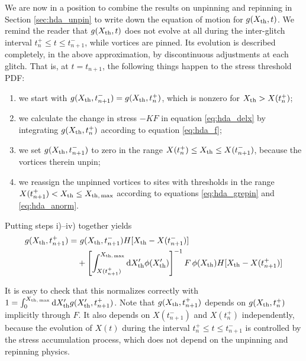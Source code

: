 We are now in a position to combine the results on unpinning and repinning in Section \ref{sec:hda_unpin} to write down the equation of motion for $g(X_{\rm th},t)$. We remind the reader that $g(X_{\rm th},t)$ does not evolve at all during the inter-glitch interval $t_n^+ \leq t \leq t_{n+1}^-$, while vortices are pinned. Its evolution is described completely, in the above approximation, by discontinuous adjustments at each glitch. That is, at $t = t_{n+1}$, the following things happen to the stress threshold PDF: \begin{enumerate}
\item we start with $g(X_{\rm th}, t_{n+1}^-) = g(X_{\rm th},t_n^+)$, which is nonzero for $X_{\rm th} > X(t_n^+)$; 
\item we calculate the change in stress $-KF$ in equation \eqref{eq:hda_delx} by integrating $g(X_{\rm th},t_n^+)$ according to equation \eqref{eq:hda_f}; 
\item we set $g(X_{\rm th},t_{n+1}^-)$ to zero in the range $X(t_n^+) \leq X_{\rm th} \leq X(t_{n+1}^-)$, because the vortices therein unpin; 
\item we reassign the unpinned vortices to sites with thresholds in the range $X(t_{n+1}^+) < X_{\rm th} \leq X_{\rm th,\,max}$ according to equations \eqref{eq:hda_grepin} and \eqref{eq:hda_anorm}. \end{enumerate} Putting steps i)--iv) together yields
\begin{align}
g(X_{\rm th}, t_{n+1}^+) =&~ g(X_{\rm th}, t_{n+1}^-) H[X_{\rm th} - X(t_{n+1}^-)] \nonumber \\
&+ \left[\int_{X(t_{n+1}^+)}^{X_{\rm th,\,max}} \textrm{d} X_{\rm th}' \phi(X_{\rm th}') \right]^{-1} F\,\phi(X_{\rm th}) H[X_{\rm th} - X(t_{n+1}^+)] \label{eq:hda_geom}
\end{align}

It is easy to check that this normalizes correctly with $1 = \int_0^{X_{\rm th,\,max}}\textrm{d} X_{\rm th}' g(X_{\rm th}', t_{n+1}^+)$. Note that $g(X_{\rm th}, t_{n+1}^+)$ depends on $g(X_{\rm th}, t_n^+)$ implicitly through $F$. It also depends on $X(t_{n+1}^-)$ and $X(t_n^+)$ independently, because the evolution of $X(t)$ during the interval $t_n^+ \leq t \leq t_{n+1}^-$ is controlled by the stress accumulation process, which does not depend on the unpinning and repinning physics.

